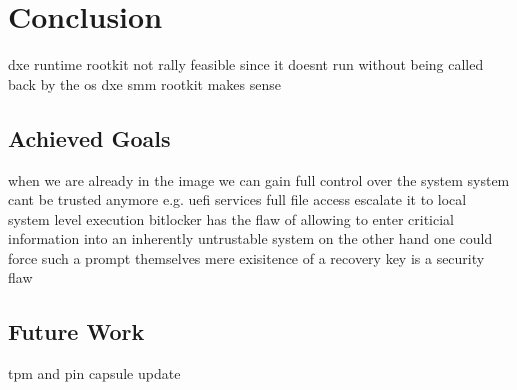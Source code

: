 
\chapter{Conclusion}

dxe runtime rootkit not rally feasible since it doesnt run without being called back by the os
dxe smm rootkit makes sense

\section{Achieved Goals}
when we are already in the image we can gain full control over the system
system cant be trusted anymore e.g. uefi services
full file access
escalate it to local system level execution
bitlocker has the flaw of allowing to enter criticial information into an inherently untrustable system
on the other hand one could force such a prompt themselves
mere exisitence of a recovery key is a security flaw

\section{Future Work}
tpm and pin
capsule update